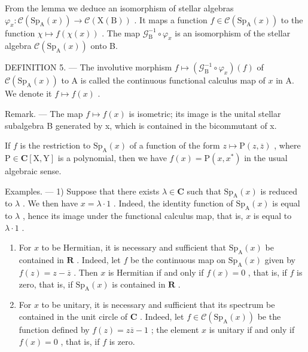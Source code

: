 From the lemma we deduce an isomorphism of stellar algebras \(\varphi_x\colon \mathcal{C}(\mathrm{Sp}_{\mathrm{A}}(x))\to \mathcal{C}(\mathrm{X(B)})\) . It maps a function \(f\in \mathcal{C}(\mathrm{Sp}_{\mathrm{A}}(x))\) to the function \(\chi \mapsto f(\chi (x))\) . The map \(\mathcal{G}_{\mathrm{B}}^{-1}\circ \varphi_{x}\) is an isomorphism of the stellar algebra \(\mathcal{C}(\mathrm{Sp}_{\mathrm{A}}(x))\) onto B.

DEFINITION 5. --- The involutive morphism \(f \mapsto (\mathcal{G}_{\mathrm{B}}^{-1} \circ \varphi_x)(f)\) of \(\mathcal{C}(\mathrm{Sp}_{\mathrm{A}}(x))\) to A is called the continuous functional calculus map of \(x\) in A. We denote it \(f \mapsto f(x)\) .

Remark. --- The map \(f \mapsto f(x)\) is isometric; its image is the unital stellar subalgebra B generated by x, which is contained in the bicommutant of x.

If \(f\) is the restriction to \(\mathrm{Sp}_{\mathrm{A}}(x)\) of a function of the form \(z \mapsto \mathrm{P}(z, \overline{z})\) , where \(\mathrm{P} \in \mathbf{C}[\mathrm{X}, \mathrm{Y}]\) is a polynomial, then we have \(f(x) = \mathrm{P}(x, x^{*})\) in the usual algebraic sense.

Examples. --- 1) Suppose that there exists \(\lambda \in \mathbf{C}\) such that \(\mathrm{Sp}_{\mathrm{A}}(x)\) is reduced to \(\lambda\) . We then have \(x = \lambda \cdot 1\) . Indeed, the identity function of \(\mathrm{Sp}_{\mathrm{A}}(x)\) is equal to \(\lambda\) , hence its image under the functional calculus map, that is, \(x\) is equal to \(\lambda \cdot 1\) .

\begin{enumerate}
\def\labelenumi{\arabic{enumi})}
\setcounter{enumi}{1}
\item
  For \(x\) to be Hermitian, it is necessary and sufficient that \(\mathrm{Sp}_{\mathrm{A}}(x)\) be contained in \(\mathbf{R}\) . Indeed, let \(f\) be the continuous map on \(\mathrm{Sp}_{\mathrm{A}}(x)\) given by \(f(z) = z - \overline{z}\) . Then \(x\) is Hermitian if and only if \(f(x) = 0\) , that is, if \(f\) is zero, that is, if \(\mathrm{Sp}_{\mathrm{A}}(x)\) is contained in \(\mathbf{R}\) .
\item
  For \(x\) to be unitary, it is necessary and sufficient that its spectrum be contained in the unit circle of \(\mathbf{C}\) . Indeed, let \(f \in \mathcal{C}(\mathrm{Sp}_{\mathrm{A}}(x))\) be the function defined by \(f(z) = z\overline{z} - 1\) ; the element \(x\) is unitary if and only if \(f(x) = 0\) , that is, if \(f\) is zero.
\end{enumerate}

